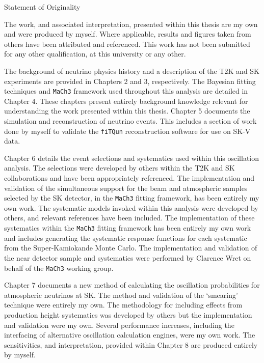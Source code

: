 \begin{center}
  \huge{Statement of Originality}
\end{center}

The work, and associated interpretation, presented within this thesis are my own and were produced by myself. Where applicable, results and figures taken from others have been attributed and referenced. This work has not been submitted for any other qualification, at this university or any other.

The background of neutrino physics history and a description of the T2K and SK experiments are provided in Chapters 2 and 3, respectively. The Bayesian fitting techniques and \texttt{MaCh3} framework used throughout this analysis are detailed in Chapter 4. These chapters present entirely background knowledge relevant for understanding the work presented within this thesis. Chapter 5 documents the simulation and reconstruction of neutrino events. This includes a section of work done by myself to validate the \texttt{fiTQun} reconstruction software for use on SK-V data.

Chapter 6 details the event selections and systematics used within this oscillation analysis. The selections were developed by others within the T2K and SK collaborations and have been appropriately referenced. The implementation and validation of the simultaneous support for the beam and atmospheric samples selected by the SK detector, in the \texttt{MaCh3} fitting framework, has been entirely my own work. The systematic models invoked within this analysis were developed by others, and relevant references have been included. The implementation of these systematics within the \texttt{MaCh3} fitting framework has been entirely my own work and includes generating the systematic response functions for each systematic from the Super-Kamiokande Monte Carlo. The implementation and validation of the near detector sample and systematics were performed by Clarence Wret on behalf of the \texttt{MaCh3} working group.

Chapter 7 documents a new method of calculating the oscillation probabilities for atmospheric neutrinos at SK. The method and validation of the `smearing' technique were entirely my own. The methodology for including effects from production height systematics was developed by others but the implementation and validation were my own. Several performance increases, including the interfacing of alternative oscillation calculation engines, were my own work. The sensitivities, and interpretation, provided within Chapter 8 are produced entirely by myself. 
